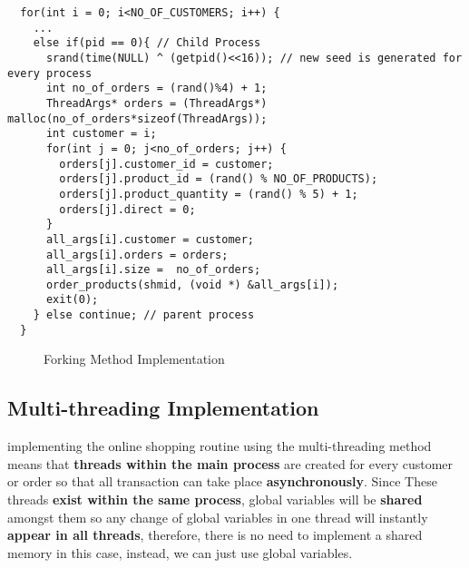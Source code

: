 \documentclass[pdftex,12pt,a4paper]{article}
\begin{document}
\begin{lstlisting}
  for(int i = 0; i<NO_OF_CUSTOMERS; i++) {
	...    
    else if(pid == 0){ // Child Process
      srand(time(NULL) ^ (getpid()<<16)); // new seed is generated for every process
      int no_of_orders = (rand()%4) + 1;
      ThreadArgs* orders = (ThreadArgs*) malloc(no_of_orders*sizeof(ThreadArgs));
      int customer = i;
      for(int j = 0; j<no_of_orders; j++) {
        orders[j].customer_id = customer;
        orders[j].product_id = (rand() % NO_OF_PRODUCTS);
        orders[j].product_quantity = (rand() % 5) + 1;
        orders[j].direct = 0;
      }
      all_args[i].customer = customer;
      all_args[i].orders = orders;
      all_args[i].size =  no_of_orders;
      order_products(shmid, (void *) &all_args[i]);
      exit(0);
    } else continue; // parent process
  }
\end{lstlisting}
\begin{figure}[H]
\label{fig:fork}
\caption{Forking Method Implementation}
\end{figure}

\subsection{Multi-threading Implementation}
implementing the online shopping routine using the multi-threading method means that \textbf{threads within the main process} are created for every customer or order so that all transaction can take place \textbf{asynchronously}. Since These threads \textbf{exist within the same process}, global variables will be \textbf{shared} amongst them so any change of global variables in one thread will instantly \textbf{appear in  all threads}, therefore, there is no need to implement a shared memory in this case, instead, we can just use global variables.
\end{document}
